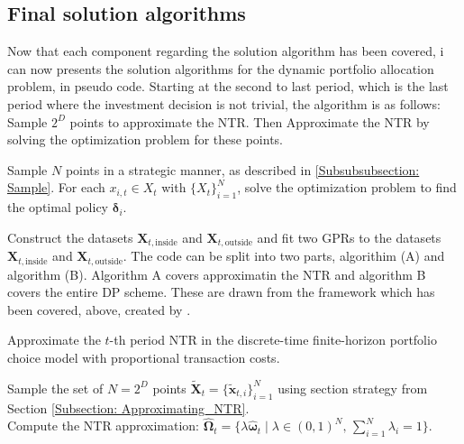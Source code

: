 \documentclass[11pt]{article}
\begin{document}
\subsection{Final solution algorithms} \label{Subsection: Algorithm}
Now that each component regarding the solution algorithm has been covered, i can now presents the solution algorithms for the dynamic portfolio allocation problem, in pseudo code.
Starting at the second to last period, which is the last period where the investment decision is not trivial, the algorithm is as follows:
Sample $2^{D}$ points to approximate the \ac{NTR}. Then Approximate the \ac{NTR} by solving the optimization problem for these points.

Sample $N$ points in a strategic manner, as described in \ref{Subsubsubsection: Sample}. For each $x_{i,t} \in X_{t}$ with $\{ X_t \}^{N}_{i=1}$, solve the optimization problem to find the optimal policy $\boldsymbol{\delta}_{i}$.

Construct the datasets $\mathbf{X}_{t,\text{inside}}$ and $\mathbf{X}_{t,\text{outside}}$ and fit two \ac{GPR}s to the datasets $\mathbf{X}_{t,\text{inside}}$ and $\mathbf{X}_{t,\text{outside}}$.
The code can be split into two parts, algorithim (A) and algorithm (B). Algorithm A covers approximatin the NTR and algorithm B covers the entire \ac{DP} scheme.
These are drawn from the framework which has been covered, above, created by \autocite{Scheidegger2023}.

\begin{tcolorbox}[algobox]
\scriptsize{
\begin{algorithm}[H]
  \caption{Approximate the $t$-th period NTR in the discrete-time finite-horizon portfolio choice model with proportional transaction costs.}
  Sample the set of $N = 2^D$ points $\tilde{\mathbf{X}}_t = \{\tilde{\mathbf{x}}_{t,i}\}_{i=1}^N$ using section strategy from Section \ref{Subsection: Approximating_NTR}.\\
  Compute the NTR approximation: $\hat{\boldsymbol{\Omega}}_t = \{\lambda \hat{\boldsymbol{\omega}}_t \mid \lambda \in (0,1)^N, \, \sum_{i=1}^N \lambda_i = 1\}$.
\end{algorithm}
}
\end{tcolorbox}
\end{document}
